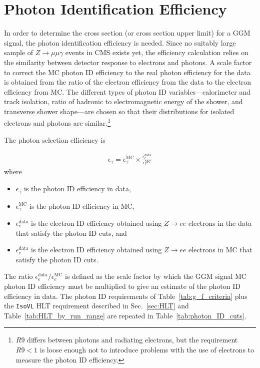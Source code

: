 \documentclass[dissertation.tex]{subfiles}
\begin{document}
\section{Photon Identification Efficiency}
\label{sec:Photon Identification Efficiency}

In order to determine the cross section (or cross section upper limit) for a GGM signal, the photon identification efficiency is needed.  Since no suitably large sample of $Z\rightarrow\mu\mu\gamma$ events in CMS exists yet, the efficiency calculation relies on the similarity between detector response to electrons and photons.  A scale factor to correct the MC photon ID efficiency to the real photon efficiency for the data is obtained from the ratio of the electron efficiency from the data to the electron efficiency from MC.  The different types of photon ID variables---calorimeter and track isolation, ratio of hadronic to electromagnetic energy of the shower, and transverse shower shape---are chosen so that their distributions for isolated electrons and photons are similar.\footnote{$R9$ differs between photons and radiating electrons, but the requirement $R9 < 1$ is loose enough not to introduce problems with the use of electrons to measure the photon ID efficiency.}

The photon selection efficiency is

\begin{eqnarray}
\label{eq:photon_ID_efficiency}
\epsilon_{\gamma} = \epsilon_{\gamma}^{\mathrm{MC}}\times\frac{\epsilon_{e}^{\mathrm{data}}}{\epsilon_{e}^{\mathrm{MC}}}
\end{eqnarray}
%
where

\begin{itemize}
  \item $\epsilon_{\gamma}$ is the photon ID efficiency in data,
  \item $\epsilon_{\gamma}^{\mathrm{MC}}$ is the photon ID efficiency in MC,
  \item $\epsilon_{e}^{\mathrm{data}}$ is the electron ID efficiency obtained using $Z\rightarrow ee$ electrons in the data that satisfy the photon ID cuts, and
  \item $\epsilon_{e}^{\mathrm{data}}$ is the electron ID efficiency obtained using $Z\rightarrow ee$ electrons in MC that satisfy the photon ID cuts.
\end{itemize}

The ratio $\epsilon_{e}^{\mathrm{data}}/\epsilon_{e}^{\mathrm{MC}}$ is defined as the scale factor by which the GGM signal MC photon ID efficiency must be multiplied to give an estimate of the photon ID efficiency in data.  The photon ID requirements of Table~\ref{tab:g_f_criteria} plus the \verb+IsoVL+ HLT requirement described in Sec.~\ref{sec:HLT} and Table~\ref{tab:HLT_by_run_range} are repeated in Table~\ref{tab:photon_ID_cuts}.
\end{document}
